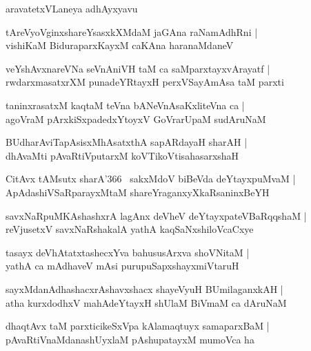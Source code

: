\documentclass[twoside,12pt,openright]{book}
\newcounter{shloka}[chapter]
\begin{document}
\begin{center}
aravatetxVLaneya adhAyxyavu
\end{center}

\begin{shloka}%
tAreVyoVginxshareYsasxkXMdaM jaGAna raNamAdhRni |\\
vishiKaM BiduraparxKayxM caKAna haranaMdaneV 
\end{shloka}

\begin{shloka}%
veYshAvxnareVNa seVnAniVH taM ca saMparxtayxvArayatf |\\
rwdarxmasatxrXM punadeYRtayxH perxVSayAmAsa taM parxti
\end{shloka}

\begin{shloka}%
taninxrasatxM kaqtaM teVna bANeVnAsaKxliteVna ca |\\
agoVraM pArxkiSxpadedxYtoyxV GoVrarUpaM sudAruNaM 
\end{shloka}

\begin{shloka}%
BUdharAviTapAsisxMhAsatxthA sapARdayaH sharAH |\\
dhAvaMti pAvaRtiVputarxM koVTikoVtisahasarxshaH
\end{shloka}

\begin{shloka}%
CitAvx tAMsutx sharA\char'366 ~sakxMdoV biBeVda deYtayxpuMvaM |\\
ApAdashiVSaRparayxMtaM shareYraganxyXkaRsaninxBeYH 
\end{shloka}

\begin{shloka}%
savxNaRpuMKAshashxrA lagAnx deVheV deYtayxpateVBaRqqshaM |\\
reVjusetxV savxNaRshakalA yathA kaqSaNxshiloVcaCxye
\end{shloka}

\begin{shloka}%
tasayx deVhAtatxtashecxYva bahususArxva shoVNitaM |\\
yathA ca mAdhaveV mAsi purupuSapxshayxmiVtaruH 
\end{shloka}

\begin{shloka}%
sayxMdanAdhashacxrAshavxshacx shayeVyuH BUmilaganxkAH |\\
atha kurxdodhxV mahAdeYtayxH shUlaM BiVmaM ca dAruNaM
\end{shloka}

\begin{shloka}%
dhaqtAvx taM parxticikeSxVpa kAlamaqtuyx samaparxBaM |\\
pAvaRtiVnaMdanashUyxlaM pAshupatayxM mumoVca ha 
\end{shloka}
\end{document}
